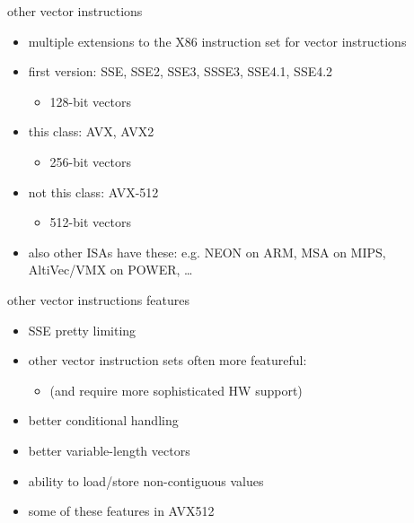 \begin{frame}{other vector instructions}
    \begin{itemize}
    \item multiple extensions to the X86 instruction set for vector instructions
    \item first version: SSE, SSE2, SSE3, SSSE3, SSE4.1, SSE4.2
        \begin{itemize}
        \item 128-bit vectors
        \end{itemize}
    \item this class: AVX, AVX2
        \begin{itemize}
        \item 256-bit vectors
        \end{itemize}
    \item not this class: AVX-512
        \begin{itemize}
        \item 512-bit vectors
        \end{itemize}
        \vspace{.5cm}
    \item also other ISAs have these: e.g. NEON on ARM, MSA on MIPS, AltiVec/VMX on POWER, \ldots
    \end{itemize}
\end{frame}

\begin{frame}{other vector instructions features}
    \begin{itemize}
    \item SSE\* pretty limiting
    \item other vector instruction sets often more featureful:
        \begin{itemize}
            \item (and require more sophisticated HW support)
        \end{itemize}
        \vspace{.5cm}
    \item better conditional handling
    \item better variable-length vectors
    \item ability to load/store non-contiguous values
    \vspace{.5cm}
    \item some of these features in AVX512
    \end{itemize}
\end{frame}
